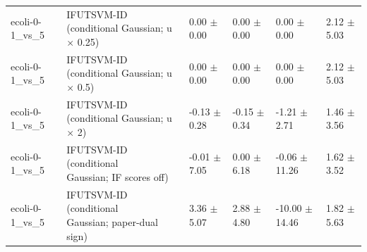 \begin{table}[!t]
{\begin{tabular}{llllll}
ecoli-0-1\_vs\_5 & \shortstack[l]{IFUTSVM-ID (conditional\\Gaussian; u \(\times\) 0.25)} & 0.00 \(\pm\) 0.00 & 0.00 \(\pm\) 0.00 & 0.00 \(\pm\) 0.00 & 2.12 \(\pm\) 5.03 \\
ecoli-0-1\_vs\_5 & \shortstack[l]{IFUTSVM-ID (conditional\\Gaussian; u \(\times\) 0.5)} & 0.00 \(\pm\) 0.00 & 0.00 \(\pm\) 0.00 & 0.00 \(\pm\) 0.00 & 2.12 \(\pm\) 5.03 \\
ecoli-0-1\_vs\_5 & \shortstack[l]{IFUTSVM-ID (conditional\\Gaussian; u \(\times\) 2)} & -0.13 \(\pm\) 0.28 & -0.15 \(\pm\) 0.34 & -1.21 \(\pm\) 2.71 & 1.46 \(\pm\) 3.56 \\
ecoli-0-1\_vs\_5 & \shortstack[l]{IFUTSVM-ID (conditional\\Gaussian; IF scores off)} & -0.01 \(\pm\) 7.05 & 0.00 \(\pm\) 6.18 & -0.06 \(\pm\) 11.26 & 1.62 \(\pm\) 3.52 \\
ecoli-0-1\_vs\_5 & \shortstack[l]{IFUTSVM-ID (conditional\\Gaussian; paper-dual\\sign)} & 3.36 \(\pm\) 5.07 & 2.88 \(\pm\) 4.80 & -10.00 \(\pm\) 14.46 & 1.82 \(\pm\) 5.63 \\
\hline
\end{tabular}%
}
\end{table}

